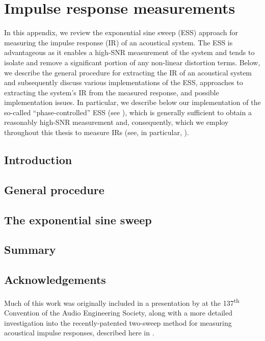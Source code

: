 \chapter{Impulse response measurements}\label{chap:A5_Impulse_Response}
In this appendix, we review the exponential sine sweep (ESS) approach for measuring the impulse response (IR) of an acoustical system.
The ESS is advantageous as it enables a high-SNR measurement of the system and tends to isolate and remove a significant portion of any non-linear distortion terms.
Below, we describe the general procedure for extracting the IR of an acoustical system and subsequently discuss various implementations of the ESS, approaches to extracting the system's IR from the measured response, and possible implementation issues.
In particular, we describe below our implementation of the so-called ``phase-controlled'' ESS (see ), which is generally sufficient to obtain a reasonably high-SNR measurement and, consequently, which we employ throughout this thesis to measure IRs (see, in particular, ).

\section{Introduction}\label{sec:A5_Impulse_Response:Introduction}


\section{General procedure}\label{sec:A5_Impulse_Response:Procedure}


\section{The exponential sine sweep}\label{sec:A5_Impulse_Response:ESS}


\section{Summary}\label{sec:A5_Impulse_Response:Summary}


\section*{Acknowledgements}
Much of this work was originally included in a presentation by \citet{Tylka2014} at the 137\textsuperscript{th} Convention of the Audio Engineering Society, along with a more detailed investigation into the recently-patented two-sweep method for measuring acoustical impulse responses, described here in .